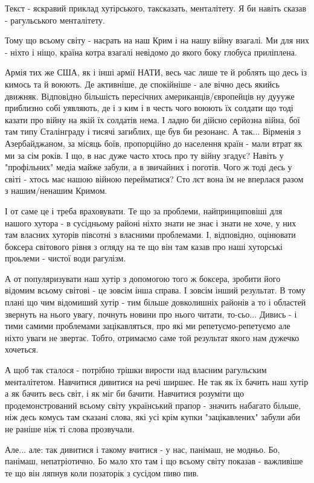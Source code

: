 \begin{itemize}
Текст - яскравий приклад хутірського, таксказать, менталітету. Я би навіть
сказав - рагульського менталітету.

Тому що всьому світу - насрать на наш Крим і на нашу війну взагалі. Ми для них
- ніхто і ніщо, країна котра взагалі невідомо до якого боку глобуса приліплена.

Армія тих же США, як і інші армії НАТИ, весь час лише те й роблять що десь із
кимось та й воюють. Де активніше, де спокійніше - але вічно десь якийсь
движняк. Відповідно більшість пересічних американців/європейців ну дуууже
приблизно собі уявляють, де і з ким і в честь чого воюють їх солдати що тоді
казати про війну на якій їх солдатів нема. І ладно би дійсно серйозна війна,
бої там типу Сталінграду і тисячі загиблих, ще був би резонанс. А так...
Вірменія з Азербайджаном, за місяць боїв, пропорційно до населення країн - мали
втрат як ми за сім років. І що, в нас дуже часто хтось про ту війну згадує?
Навіть у "профільних" медіа майже забули, а в звичайних і поготів. Чого ж тоді
десь у світі - хтось має нашою війною перейматися? Сто лєт вона їм не вперлася
разом з нашим/ненашим Кримом.

І от саме це і треба враховувати. Те що за проблеми, найпринциповіші для нашого
хутора - в сусідньому районі ніхто знати не знає і знати не хоче, у них там
власних хуторів півсотні з власними проблемами. І, відповідно, оцінювати
боксера світового рівня з огляду на те що він там казав про наші хуторські
проьлеми - чистої води рагулізм.

А от популяризувати наш хутір з допомогою того ж боксера, зробити його відомим
всьому світові - це зовсім інша справа. І зовсім інший результат. В тому плані
що чим відомиший хутір - тим більше довколишніх районів а то і областей
звернуть на нього увагу, почнуть новини про нього читати, то-сьо... Дивись - і
тими самими проблемами зацікавляться, про які ми репетуємо-репетуємо але ніхто
уваги не звертає. Тобто, отримаємо саме той результат якого нам дужечко
хочеться.

А щоб так сталося - потрібно трішки вирости над власним рагульским
менталітетом. Навчитися дивитися на речі ширшеє. Не так як їх бачить наш хутір
а як бачить весь світ, і як міг би бачити. Навчитися розуміти що
продемонстрований всьому світу український прапор - значить набагато більше,
ніж десь комусь там сказані слова, які усі крім купки "зацікавлених" забули аби
не раніше ніж ті слова прозвучали.

Але... але: так дивитися і такому вчитися - у нас, панімаш, не модньо. Бо,
панімаш, непатріотично. Бо мало хто там і що всьому світу показав - важливіше
те що він ляпнув коли позаторік з сусідом пиво пив.


\end{itemize}
